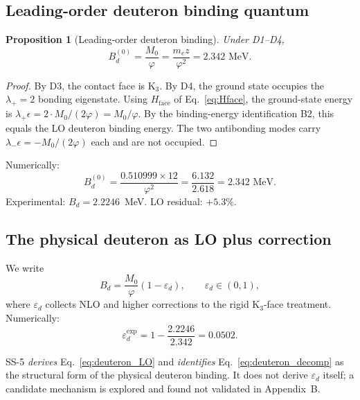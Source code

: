 \documentclass[11pt,letterpaper]{article}
\newtheorem{proposition}[theorem]{Proposition}
\newcommand{\phig}{\varphi}
\newcommand{\Mzero}{M_0}
\newcommand{\Bd}{B_{d}}
\newcommand{\Bdlo}{B_{d}^{(0)}}
\newcommand{\epsd}{\varepsilon_{d}}
\begin{document}
\subsection{Leading-order deuteron binding quantum}

\begin{proposition}[Leading-order deuteron binding]
\label{prop:deuteron_LO}
Under D1--D4,
\begin{equation}
\boxed{\Bdlo = \frac{\Mzero}{\phig} = \frac{m_e z}{\phig^2} = 2.342\text{ MeV}.}
\label{eq:deuteron_LO}
\end{equation}
\end{proposition}

\begin{proof}
By D3, the contact face is K$_3$. By D4, the ground state occupies the $\lambda_+ = 2$ bonding eigenstate. Using $H_{\mathrm{face}}$ of Eq.~\ref{eq:Hface}, the ground-state energy is $\lambda_+ \epsilon = 2 \cdot \Mzero/(2\phig) = \Mzero/\phig$. By the binding-energy identification B2, this equals the LO deuteron binding energy. The two antibonding modes carry $\lambda_- \epsilon = -\Mzero/(2\phig)$ each and are not occupied.
\end{proof}

Numerically:
\[
\Bdlo = \frac{0.510999 \times 12}{\phig^2} = \frac{6.132}{2.618} = 2.342 \text{ MeV}.
\]
Experimental: $\Bd = 2.2246$~MeV. LO residual: $+5.3\%$.

\subsection{The physical deuteron as LO plus correction}

We write
\begin{equation}
\boxed{\Bd = \frac{\Mzero}{\phig}(1 - \epsd), \qquad \epsd \in (0, 1),}
\label{eq:deuteron_decomp}
\end{equation}
where $\epsd$ collects NLO and higher corrections to the rigid K$_3$-face treatment. Numerically:
\[
\epsd^{\mathrm{exp}} = 1 - \frac{2.2246}{2.342} = 0.0502.
\]

SS-5 \emph{derives} Eq.~\ref{eq:deuteron_LO} and \emph{identifies} Eq.~\ref{eq:deuteron_decomp} as the structural form of the physical deuteron binding. It does not derive $\epsd$ itself; a candidate mechanism is explored and found not validated in Appendix~B.
\end{document}
